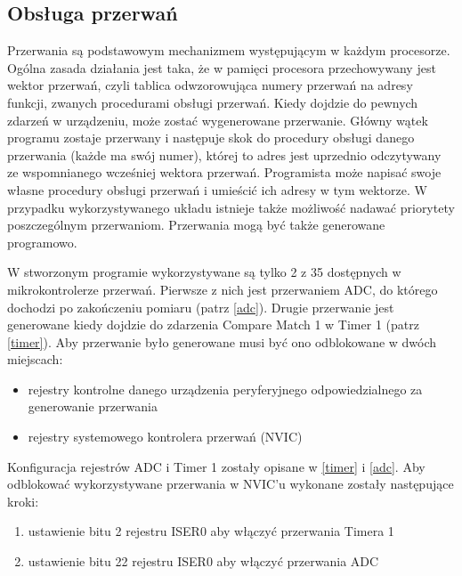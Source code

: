 \subsection{Obsługa przerwań}
Przerwania są podstawowym mechanizmem występującym w każdym procesorze. Ogólna zasada działania jest taka, że w pamięci procesora przechowywany jest wektor przerwań, czyli tablica odwzorowująca numery przerwań na adresy funkcji, zwanych procedurami obsługi przerwań. Kiedy dojdzie do pewnych zdarzeń w urządzeniu, może zostać wygenerowane przerwanie. Główny wątek programu zostaje przerwany i następuje skok do procedury obsługi danego przerwania (każde ma swój numer), której to adres jest uprzednio odczytywany ze wspomnianego wcześniej wektora przerwań. Programista może napisać swoje własne procedury obsługi przerwań i umieścić ich adresy w tym wektorze. W przypadku wykorzystywanego układu istnieje także możliwość nadawać priorytety poszczególnym przerwaniom. Przerwania mogą być także generowane programowo.

W stworzonym programie wykorzystywane są tylko 2 z 35 dostępnych w mikrokontrolerze przerwań. Pierwsze z nich jest przerwaniem ADC, do którego dochodzi po zakończeniu pomiaru (patrz \ref{adc}). Drugie przerwanie jest generowane kiedy dojdzie do zdarzenia Compare Match 1 w Timer 1 (patrz \ref{timer}). Aby przerwanie było generowane musi być ono odblokowane w dwóch miejscach:
\begin{itemize}
    \item rejestry kontrolne danego urządzenia peryferyjnego odpowiedzialnego za generowanie przerwania
    \item rejestry systemowego kontrolera przerwań (NVIC)
\end{itemize}
Konfiguracja rejestrów ADC i Timer 1 zostały opisane w \ref{timer} i \ref{adc}. Aby odblokować wykorzystywane przerwania w NVIC'u wykonane zostały następujące kroki:
\begin{enumerate}
    \item ustawienie bitu 2 rejestru ISER0 aby włączyć przerwania Timera 1
    \item ustawienie bitu 22 rejestru ISER0 aby włączyć przerwania ADC
\end{enumerate}
